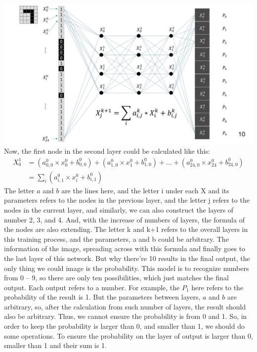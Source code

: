 \documentclass[12pt]{article}
\begin{document}
\vspace{10pt} 
\includegraphics[page = 1, width=\linewidth]{Neural Networks Exemplar.pdf}
Now, the first node in the second layer could be calculated like this: 
\begin{align}
X^1_{0} &= (a^0_{0,0} \times x^0_{0} + b^0_{0,0}) + (a^0_{1,0} \times x^0_{1} + b^0_{1,0}) + \ldots + (a^0_{24,0} \times x^0_{24} + b^0_{24,0}) \\
&= \sum_{i} (a^0_{i,1} \times x^0_{i} + b^0_{i,1})
\end{align}
The letter $a$ and $b$ are the lines here, and the letter i under each X and its parameters refers to the nodes in the previous layer, and the letter j refers to the nodes in the current layer, and similarly, we can also construct the layers of number 2, 3, and 4. And, with the increase of numbers of layers, the formula of the nodes are also extending. The letter k and k+1 refers to the overall layers in this training process, and the parameters, a and b could be arbitrary. The information of the image, spreading across with this formula and finally goes to the last layer of this network. But why there’re 10 results in the final output, the only thing we could image is the probability. This model is to recognize numbers from 0 – 9, so there are only ten possibilities, which just matches the final output. Each output refers to a number. For example, the $P_1$ here refers to the probability of the result is 1. But the parameters between layers, $a$ and $b$ are arbitrary, so, after the calculation from such number of layers, the result should also be arbitrary. Thus, we cannot ensure the probability is from 0 and 1. So, in order to keep the probability is larger than 0, and smaller than 1, we should do some operations. To ensure the probability on the layer of output is larger than 0, smaller than 1 and their sum is 1.
\end{document}
